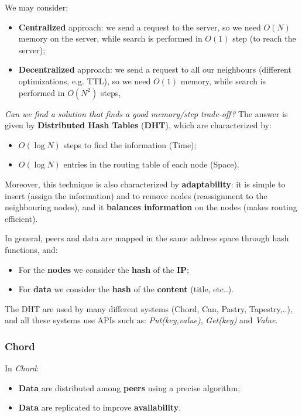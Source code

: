 We may consider:
\begin{itemize}
    \item \textbf{Centralized} approach: we send a request to the server, so we need $O(N)$ memory on the server, while search is performed in $O(1)$ step (to reach the server);
    \item \textbf{Decentralized} approach: we send a request to all our neighbours (different optimizations, e.g. TTL), so we need $O(1)$ memory, while search is performed in $O(N^2)$ steps,
\end{itemize}


\textit{Can we find a solution that finds a good memory/step trade-off?} The answer is given by \textbf{Distributed Hash Tables} (\textbf{DHT}), which are characterized by:
\begin{itemize}
    \item $O(\log N)$ steps to find the information (Time);
    \item $O(\log N)$ entries in the routing table of each node (Space).
\end{itemize}

Moreover, this technique is also characterized by \textbf{adaptability}: it is simple to insert (assign the information) and to remove nodes (reassignment to the neighbouring nodes), and it \textbf{balances information} on the nodes (makes routing efficient).

In general, peers and data are mapped in the same address space through hash functions, and:
\begin{itemize}
    \item For the \textbf{nodes} we consider the \textbf{hash} of the \textbf{IP};
    \item For \textbf{data} we consider the \textbf{hash} of the \textbf{content} (title, etc..).
\end{itemize} 

The DHT are used by many different systems (Chord, Can, Pastry, Tapestry,..), and all these systems use APIs such as: \textit{Put(key,value)}, \textit{Get(key)} and \textit{Value}.

\subsubsection{Chord}
In \textit{Chord}:
\begin{itemize}
    \item \textbf{Data} are distributed among \textbf{peers} using a precise algorithm;
    \item \textbf{Data} are replicated to improve \textbf{availability}.
\end{itemize}

